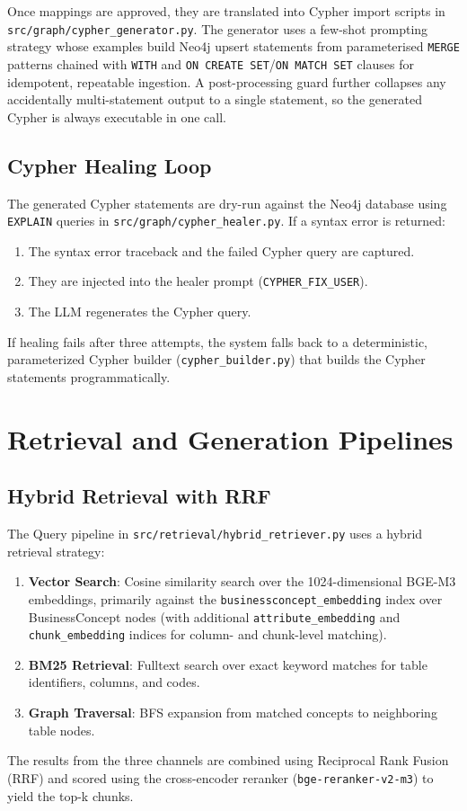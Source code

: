 Once mappings are approved, they are translated into Cypher import scripts in \texttt{src/graph/cypher\_generator.py}. The generator uses a few-shot prompting strategy whose examples build Neo4j upsert statements from parameterised \texttt{MERGE} patterns chained with \texttt{WITH} and \texttt{ON CREATE SET}/\texttt{ON MATCH SET} clauses for idempotent, repeatable ingestion. A post-processing guard further collapses any accidentally multi-statement output to a single statement, so the generated Cypher is always executable in one call.

\subsection{Cypher Healing Loop}
\label{sec:imp:cypher_healer}

The generated Cypher statements are dry-run against the Neo4j database using \texttt{EXPLAIN} queries in \texttt{src/graph/cypher\_healer.py}. If a syntax error is returned:
\begin{enumerate}
    \item The syntax error traceback and the failed Cypher query are captured.
    \item They are injected into the healer prompt (\texttt{CYPHER\_FIX\_USER}).
    \item The LLM regenerates the Cypher query.
\end{enumerate}
If healing fails after three attempts, the system falls back to a deterministic, parameterized Cypher builder (\texttt{cypher\_builder.py}) that builds the Cypher statements programmatically.

\section{Retrieval and Generation Pipelines}
\label{sec:imp:retrieval_gen}

\subsection{Hybrid Retrieval with RRF}
\label{sec:imp:hybrid_retrieval}

The Query pipeline in \texttt{src/retrieval/hybrid\_retriever.py} uses a hybrid retrieval strategy:
\begin{enumerate}
    \item \textbf{Vector Search}: Cosine similarity search over the 1024-dimensional BGE-M3 embeddings, primarily against the \texttt{businessconcept\_embedding} index over BusinessConcept nodes (with additional \texttt{attribute\_embedding} and \texttt{chunk\_embedding} indices for column- and chunk-level matching).
    \item \textbf{BM25 Retrieval}: Fulltext search over exact keyword matches for table identifiers, columns, and codes.
    \item \textbf{Graph Traversal}: BFS expansion from matched concepts to neighboring table nodes.
\end{enumerate}
The results from the three channels are combined using Reciprocal Rank Fusion (RRF) and scored using the cross-encoder reranker (\texttt{bge-reranker-v2-m3}) to yield the top-k chunks.

